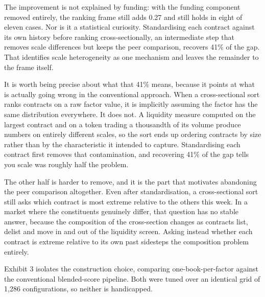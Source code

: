 \documentclass[12pt]{article}
\begin{document}
The improvement is not explained by funding: with the funding component removed
entirely, the ranking frame still adds 0.27 and still holds in eight of eleven
cases. Nor is it a statistical curiosity. Standardising each contract against its
own history before ranking cross-sectionally, an intermediate step that removes
scale differences but keeps the peer comparison, recovers 41\% of the gap. That
identifies scale heterogeneity as one mechanism and leaves the remainder to the
frame itself.

It is worth being precise about what that 41\% means, because it points at what is
actually going wrong in the conventional approach. When a cross-sectional sort
ranks contracts on a raw factor value, it is implicitly assuming the factor has the
same distribution everywhere. It does not. A liquidity measure computed on the
largest contract and on a token trading a thousandth of its volume produce numbers
on entirely different scales, so the sort ends up ordering contracts by size rather
than by the characteristic it intended to capture. Standardising each contract
first removes that contamination, and recovering 41\% of the gap tells you scale
was roughly half the problem.

The other half is harder to remove, and it is the part that motivates abandoning
the peer comparison altogether. Even after standardisation, a cross-sectional sort
still asks which contract is most extreme relative to the others this week. In a
market where the constituents genuinely differ, that question has no stable answer,
because the composition of the cross-section changes as contracts list, delist and
move in and out of the liquidity screen. Asking instead whether each contract is
extreme relative to its own past sidesteps the composition problem entirely.

Exhibit 3 isolates the construction choice, comparing one-book-per-factor against
the conventional blended-score pipeline. Both were tuned over an identical grid of
1,286 configurations, so neither is handicapped.
\end{document}
